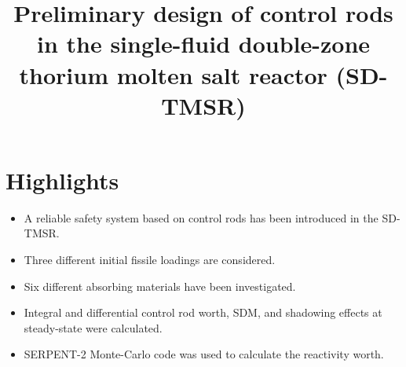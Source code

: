 \documentclass[review]{elsarticle}
\begin{document}
\begin{frontmatter}
\title{Preliminary design of control rods in the single-fluid double-zone thorium molten salt reactor (SD-TMSR)}
\end{frontmatter}
\section*{Highlights}
\begin{itemize}
	\item A reliable safety system based on control rods has been introduced in the SD-TMSR.
	\item Three different initial fissile loadings are considered.
	\item Six different absorbing materials have been investigated.
	\item Integral and differential control rod worth, SDM, and shadowing effects at steady-state were calculated.
	\item SERPENT-2 Monte-Carlo code was used to calculate the reactivity worth.
\end{itemize}
\end{document}
